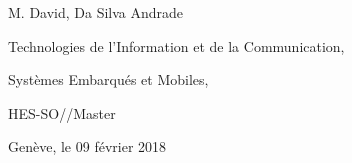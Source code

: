 \vspace{5cm}

\noindent
\begin{minipage}[t]{0.42\linewidth}
\raggedright
{}
\par
M. David, Da Silva Andrade\par
Technologies de l'Information et 
de la Communication, \par
Systèmes Embarqués et Mobiles, \par
HES-SO//Master
\end{minipage}%
\hfill
\begin{minipage}[t]{0.4\linewidth}
\newline
Genève, le 09 février 2018
\end{minipage}





